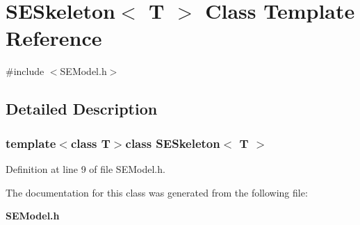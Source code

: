 \section{S\+E\+Skeleton$<$ T $>$ Class Template Reference}
\label{class_s_e_skeleton}


{\ttfamily \#include $<$S\+E\+Model.\+h$>$}



\subsection{Detailed Description}
\subsubsection*{template$<$class T$>$class S\+E\+Skeleton$<$ T $>$}



Definition at line 9 of file S\+E\+Model.\+h.



The documentation for this class was generated from the following file\+:\begin{DoxyCompactItemize}
\item 
{\bf S\+E\+Model.\+h}\end{DoxyCompactItemize}

